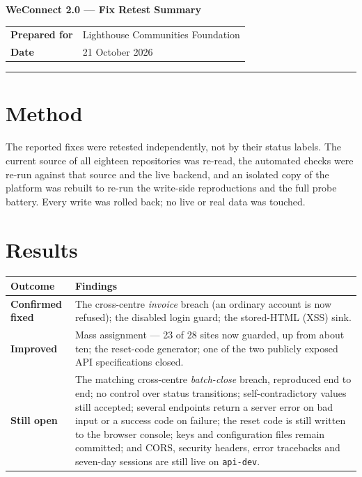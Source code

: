 \documentclass[11pt]{article}
\begin{document}
\justifying

\begin{center}
{\LARGE\bfseries WeConnect 2.0 --- Fix Retest Summary}\\[10pt]
\end{center}

\begin{tabular}{@{}ll@{}}
\textbf{Prepared for} & Lighthouse Communities Foundation \\
\textbf{Date} & 21 October 2026 \\
\end{tabular}

\vspace{3pt}\hrule\vspace{2pt}

\section{Method}
The reported fixes were retested independently, not by their status labels. The current source of all
eighteen repositories was re-read, the automated checks were re-run against that source and the live
backend, and an isolated copy of the platform was rebuilt to re-run the write-side reproductions and
the full probe battery. Every write was rolled back; no live or real data was touched.

\section{Results}
\begin{tabularx}{\textwidth}{@{}lL@{}}
\toprule
\textbf{Outcome} & \textbf{Findings} \\
\midrule
\textbf{Confirmed fixed} & The cross-centre \emph{invoice} breach (an ordinary account is now refused); the disabled login guard; the stored-HTML (XSS) sink. \\[3pt]
\textbf{Improved} & Mass assignment --- 23 of 28 sites now guarded, up from about ten; the reset-code generator; one of the two publicly exposed API specifications closed. \\[3pt]
\textbf{Still open} & The matching cross-centre \emph{batch-close} breach, reproduced end to end; no control over status transitions; self-contradictory values still accepted; several endpoints return a server error on bad input or a success code on failure; the reset code is still written to the browser console; keys and configuration files remain committed; and CORS, security headers, error tracebacks and seven-day sessions are still live on \texttt{api-dev}. \\
\bottomrule
\end{tabularx}
\end{document}
